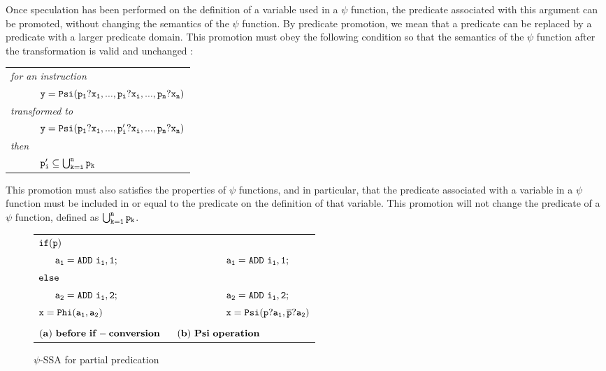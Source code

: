 \begin{itemize}
Once speculation has been performed on the definition of a variable
used in a $\psi$ function, the predicate associated with this
argument can be promoted, without changing the semantics of the $\psi$
function. By predicate promotion, we mean that a predicate can be
replaced by a predicate with a larger predicate domain. This promotion
must obey the following condition so that the semantics of the $\psi$
function after the transformation is valid and unchanged :

\begin{tabular}{ll}
\multicolumn{2}{l}{\it for an instruction} \\
\ \ \ \ & {$ {\tt y = Psi(p_1?x_1, ..., p_i?x_i, ..., p_n?x_n)}$} \\
\multicolumn{2}{l}{\it transformed to} \\
\ \ \ \ & {$ {\tt y = Psi(p_1?x_1, ..., p_i'?x_i, ..., p_n?x_n)}$} \\
\multicolumn{2}{l}{\it then} \\
\ \ \ \ & {${\tt p_i' \subseteq \bigcup_{k=i}^n p_k}$} \\
\end{tabular}

This promotion must also satisfies the properties of $\psi$
functions, and in particular, that the predicate associated with a
variable in a $\psi$ function must be included in or equal to the
predicate on the definition of that variable. This promotion will not
change the predicate of a $\psi$ function, defined as ${\tt
  \bigcup_{k=1}^n p_k}$.

\begin{figure*}
\begin{center}
\footnotesize
\begin{tabular}{llll}
${\tt if (p)}$                & & & \\
${\tt\ \ \ \ \ a_1 = ADD\ i_1,1;}$ & \ \ \ \ \ \ \ \  & \ \ \ \ \ \ \ \  & ${\tt a_1 = ADD\ i_1,1;}$ \\
${\tt else}$                  & \ \ \ \ \ \ \ \  & \ \ \ \ \ \ \ \  & \\
${\tt\ \ \ \ \ a_2 = ADD\ i_1,2;}$ & \ \ \ \ \ \ \ \  & \ \ \ \ \ \ \ \  & ${\tt a_2 = ADD\ i_1,2;}$ \\
${\tt x = Phi(a_1, a_2)}$         & \ \ \ \ \ \ \ \  & \ \ \ \ \ \ \ \  & ${\tt x = Psi(p?a_1, \overline{p}?a_2)}$ \\
\\
\multicolumn{2}{l}{${\tt{\bf (a)\ before\ if-conversion}}$} & \multicolumn{2}{l}{${\tt{\bf (b)\ Psi\ operation}}$} \\
\end{tabular}
\caption{$\psi$-SSA for partial predication}
\label{fig:psi_partial}
\end{center}
\end{figure*}


\end{itemize}
